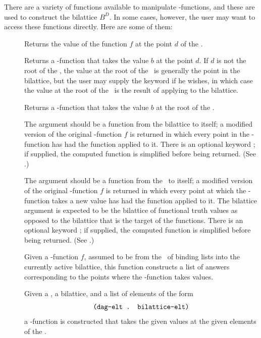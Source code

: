 There are a variety of functions available to manipulate \dg-functions,
and these are used to construct the bilattice $B^D$.  In some cases,
however, the user may want to access these functions directly.  Here
are some of them:
 \begin{description}
 \item [] Returns the value of the
function $f$ at the point $d$ of the \dg.
 \item [] Returns a \dg-function that
takes the value $b$ at the point $d$.  If $d$ is not the root of the
\dg, the value at the root of the \dg\ is generally the point
 in the bilattice, but the user may supply the keyword
 if he wishes, in which case the value at the root of
the \dg\ is the result of applying  to the bilattice.
 \item [] Returns a \dg-function that
takes the value $b$ at the root of the \dg.
 \item [] The argument
 should be a function from the bilattice to itself; a
modified version of the original \dg-function $f$ is returned in which
every point in the \dg-function has had the function 
applied to it.  There is an optional keyword ; if
supplied, the computed function is simplified before being returned.
(See .)
 \item [] The argument
 should be a function from the \dg\ to itself; a modified
version of the original \dg-function $f$ is returned in which every
point at which the \dg-function takes a new value has had the function
 applied to it.  The bilattice argument is expected to be
the bilattice of functional truth values as opposed to the bilattice
that is the target of the functions.  There is an optional keyword
; if supplied, the computed function is simplified
before being returned.  (See .)
 \item [] Given a \dg-function $f$, assumed
to be from the \dg\ of binding lists into the currently active bilattice, this
function constructs a list of answers corresponding to the points where
the \dg-function takes values.
 \item [] Given a \dg, a
bilattice, and a list of elements of the form
 \[\mbox{\tt (dag-elt . bilattice-elt)}\]
a \dg-function is constructed that takes the given values at the
given elements of the \dg.


\end{description}
